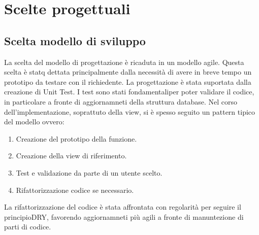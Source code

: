 \chapter{Scelte progettuali}\label{chap:ScelteProgettuali}
\section{Scelta modello di sviluppo}
La scelta del modello di progettazione è ricaduta in un modello agile.
Questa scelta è statq dettata principalmente dalla necessità di avere in breve tempo un prototipo
da testare con il richiedente.
La progettazione è stata suportata dalla creazione di Unit Test.
I test sono stati fondamentaliper poter validare il codice,
in particolare a fronte di aggiornamneti della struttura database.
Nel corso dell'implementazione, soprattuto della view, si è spesso seguito un pattern tipico del modello ovvero:
\begin{enumerate}
    \item Creazione del prototipo della funzione.
    \item Creazione della view di riferimento.
    \item Test e validazione da parte di un utente scelto.
    \item Rifattorizzazione codice se necessario.
\end{enumerate}
La rifattorizzazione del codice è stata affrontata con regolarità per seguire il principio\ac{DRY},
 favorendo aggiornamneti più agili a fronte di manuntezione di parti di codice.

